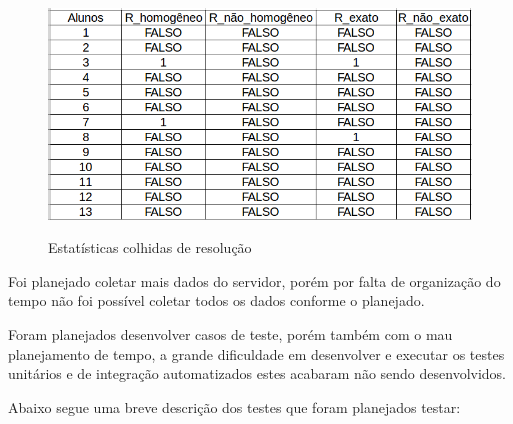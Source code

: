 \begin{figure}[H]
\centering
\caption{Estatísticas colhidas de resolução}
\includegraphics[scale=0.5]{figuras/estatisticas/estatisticas_resolucao.png}
\label{est_res}
\end{figure}

Foi planejado coletar mais dados do servidor, porém por falta de organização do tempo não foi possível coletar todos os dados conforme o planejado. 

Foram planejados desenvolver casos de teste, porém também com o mau planejamento de tempo, a grande dificuldade em desenvolver e executar os testes unitários e de integração automatizados estes acabaram não sendo desenvolvidos.

Abaixo segue uma breve descrição dos testes que foram planejados testar:


